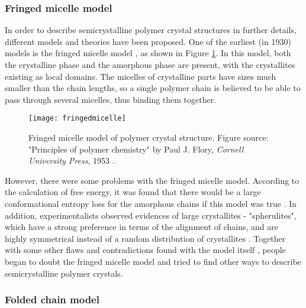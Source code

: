 \subsubsection{Fringed micelle model}

In order to describe semicrystalline polymer crystal structures in further details, different models and theories have been proposed. One of the earliest (in 1930) models is the fringed micelle model \cite{HerrmannKGerngrossO1930}, as shown in Figure \ref{fig:fringedmicelle}. In this model, both the crystalline phase and the amorphous phase are present, with the crystallites existing as local domains. The micelles of crystalline parts have sizes much smaller than the chain lengths, so a single polymer chain is believed to be able to pass through several micelles, thus binding them together.


\begin{figure}[H]
\center
\texttt{[image: fringedmicelle]}
\caption[Fringed micelle model of polymer crystal structure.]{Fringed micelle model of polymer crystal structure. Figure source: "Principles of polymer chemistry" by Paul J. Flory, \textit{Cornell University Press}, 1953 \cite{Flory1953}.}
\label{fig:fringedmicelle}
\end{figure}

However, there were some problems with the fringed micelle model. According to the calculation of free energy, it was found that there would be a large conformational entropy loss for the amorphous chains if this model was true \cite{Flory1962}. In addition, experimentalists observed evidences of large crystallites - "spherulites", which have a strong preference in terms of the alignment of chains, and are highly symmetrical instead of a random distribution of crystallites \cite{Geil1964}. Together with some other flaws and contradictions found with the model itself \cite{Zachmann1967,Zachmann1969}, people began to doubt the fringed micelle model and tried to find other ways to describe semicrystalline polymer crystals.

\subsubsection{Folded chain model} \label{sec: folded chain model}

